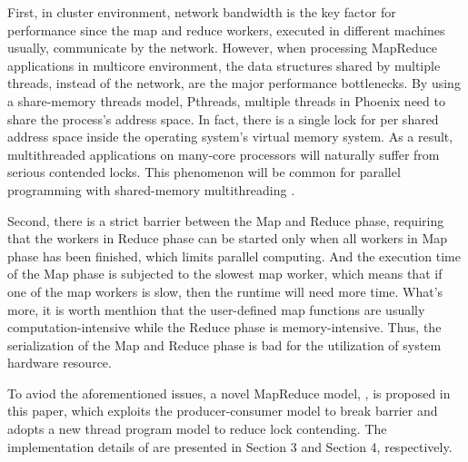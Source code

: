 First, in cluster environment, network bandwidth is the key factor for performance since the map and reduce workers, executed in different machines usually, communicate by the network.
However, when processing MapReduce applications in multicore environment, the data structures shared by multiple threads, instead of the network, are the major performance bottlenecks.
By using  a share-memory threads model, Pthreads, multiple threads in Phoenix need to share the process's address space\cite{linux}.
In fact, there is a single lock for per shared address space inside the operating system’s virtual memory system. 
As a result, multithreaded applications on many-core processors will naturally suffer from serious contended locks.
This phenomenon will be common for parallel programming with shared-memory multithreading \cite{clements2013radixvm}.


Second, there is a strict barrier between the Map and Reduce phase, requiring that the workers in Reduce phase can be started only when all workers in Map phase has been finished, 
which limits parallel computing.
And the execution time of the Map phase is subjected to the slowest map worker, which means that if one of the map workers is slow, then the runtime will need more time.
What's more, it is worth menthion that the user-defined map functions are usually computation-intensive while the Reduce phase is memory-intensive. Thus, the serialization of the Map and Reduce phase is bad for the utilization of system hardware resource.

To aviod the aforementioned issues, a novel MapReduce model, \myds,  is proposed in this paper,
which exploits the producer-consumer model to break barrier and adopts a new thread program model to reduce lock contending.
The implementation details of \myds are presented in Section 3 and Section 4, respectively.  








